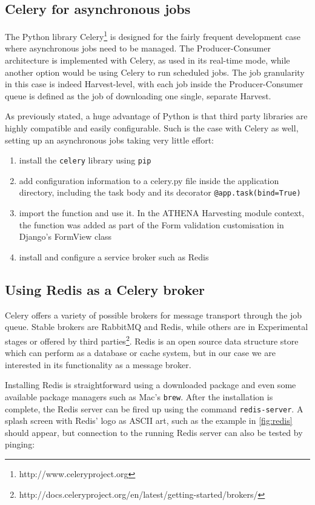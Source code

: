\documentclass[12pt,a4paper,twoside]{report}
\begin{document}
\subsection{Celery for asynchronous jobs}
The Python library Celery\footnote{http://www.celeryproject.org} is designed for the fairly frequent development case where asynchronous jobs need to be managed. The Producer-Consumer architecture is implemented with Celery, as used in its real-time mode, while another option would be using Celery to run scheduled jobs. The job granularity in this case is indeed Harvest-level, with each job inside the Producer-Consumer queue is defined as the job of downloading one single, separate Harvest.

As previously stated, a huge advantage of Python is that third party libraries are highly compatible and easily configurable. Such is the case with Celery as well, setting up an asynchronous jobs taking very little effort:

\begin{enumerate}
\item install the \texttt{celery} library using \texttt{pip}
\item add configuration information to a celery.py file inside the application directory, including the task body and its decorator \texttt{@app.task(bind=True)}
\item import the function and use it. In the ATHENA Harvesting module context, the function was added as part of the Form validation customisation in Django's FormView class
\item install and configure a service broker such as Redis
\end{enumerate}

\subsection{Using Redis as a Celery broker}
Celery offers a variety of possible brokers for message transport through the job queue. Stable brokers are RabbitMQ and Redis, while others are in Experimental stages or offered by third parties\footnote{http://docs.celeryproject.org/en/latest/getting-started/brokers/}. Redis is an open source data structure store which can perform as a database or cache system, but in our case we are interested in its functionality as a message broker.

Installing Redis is straightforward using a downloaded package and even some available package managers such as Mac's \texttt{brew}. After the installation is complete, the Redis server can be fired up using the command \texttt{redis-server}. A splash screen with Redis' logo as ASCII art, such as the example in \ref{fig:redis} should appear, but connection to the running Redis server can also be tested by pinging:
\end{document}
